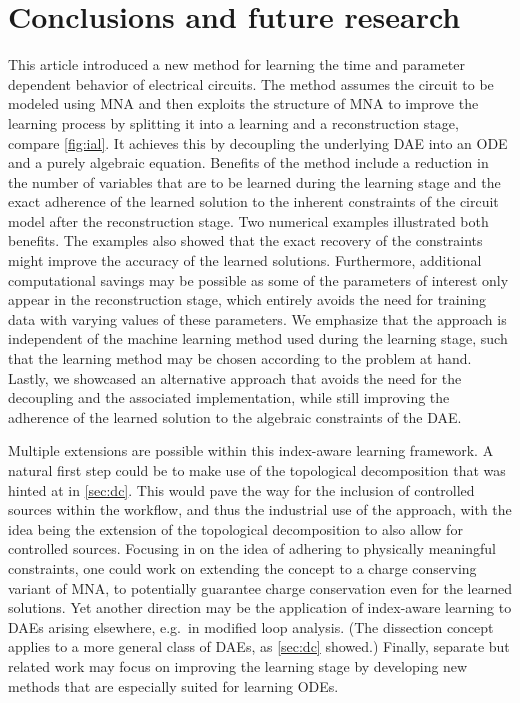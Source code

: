 \documentclass[AMA,STIX1COL]{WileyNJD-v2}
\begin{document}
\section{Conclusions and future research}
\label{sec:cfr}
This article introduced a new method for learning the time and parameter dependent behavior of electrical circuits. The method assumes the circuit to be modeled using MNA and then exploits the structure of MNA to improve the learning process by splitting it into a learning and a reconstruction stage, compare \autoref{fig:ial}. It achieves this by decoupling the underlying DAE into an ODE and a purely algebraic equation. Benefits of the method include a reduction in the number of variables that are to be learned during the learning stage and the exact adherence of the learned solution to the inherent constraints of the circuit model after the reconstruction stage. Two numerical examples illustrated both benefits. The examples also showed that the exact recovery of the constraints might improve the accuracy of the learned solutions. Furthermore, additional computational savings may be possible as some of the parameters of interest only appear in the reconstruction stage, which entirely avoids the need for training data with varying values of these parameters. We emphasize that the approach is independent of the machine learning method used during the learning stage, such that the learning method may be chosen according to the problem at hand. Lastly, we showcased an alternative approach that avoids the need for the decoupling and the associated implementation, while still improving the adherence of the learned solution to the algebraic constraints of the DAE.

Multiple extensions are possible within this index-aware learning framework. A natural first step could be to make use of the topological decomposition that was hinted at in \autoref{sec:dc}. This would pave the way for the inclusion of controlled sources within the workflow, and thus the industrial use of the approach, with the idea being the extension of the topological decomposition to also allow for controlled sources. Focusing in on the idea of adhering to physically meaningful constraints, one could work on extending the concept to a charge conserving variant of MNA, to potentially guarantee charge conservation even for the learned solutions. Yet another direction may be the application of index-aware learning to DAEs arising elsewhere, e.g.~in modified loop analysis. (The dissection concept applies to a more general class of DAEs, as \autoref{sec:dc} showed.) Finally, separate but related work may focus on improving the learning stage by developing new methods that are especially suited for learning ODEs.
\end{document}
